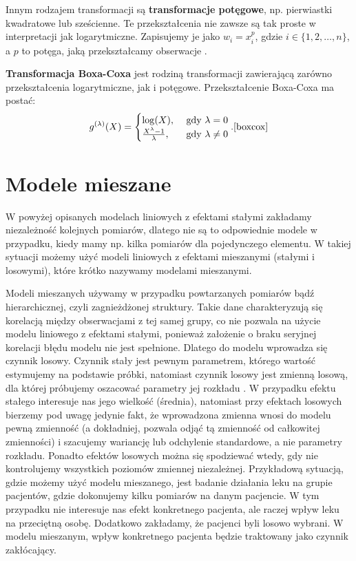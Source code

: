 \documentclass[12pt]{mwbk}
\theoremstyle{plain}
\theoremstyle{definition}
\theoremstyle{definition}
\begin{document}
Innym rodzajem transformacji są \textbf{transformacje potęgowe}, np. pierwiastki kwadratowe lub sześcienne. Te przekształcenia nie zawsze są tak proste w interpretacji jak logarytmiczne. Zapisujemy je jako $w_i=x_i^p$, gdzie $i \in \lbrace{1,2,\ldots,n\rbrace}$, a $p$ to potęga, jaką przekształcamy obserwacje \cite{forecasting}.

\textbf{Transformacja Boxa-Coxa} jest rodziną transformacji zawierającą zarówno przekształcenia logarytmiczne, jak i potęgowe. Przekształcenie Boxa-Coxa ma postać:
$$g^{(\lambda)}(X)=\begin{cases}
\log(X), & \text{ gdy } \lambda=0 \\
\frac{X^{\lambda}-1}{\lambda},&\text{ gdy } \lambda \neq 0
\end{cases}. \cite{boxcox}$$

\section{Modele mieszane} 
W powyżej opisanych modelach liniowych z efektami stałymi zakładamy niezależność kolejnych pomiarów, dlatego nie są to odpowiednie modele w przypadku, kiedy mamy np. kilka pomiarów dla pojedynczego elementu. W takiej sytuacji możemy użyć modeli liniowych z efektami mieszanymi (stałymi i losowymi), które krótko nazywamy modelami mieszanymi.

Modeli mieszanych używamy w przypadku powtarzanych pomiarów bądź hierarchicznej, czyli zagnieżdżonej struktury. Takie dane charakteryzują się korelacją między obserwacjami z tej samej grupy, co nie pozwala na użycie modelu liniowego z efektami stałymi, ponieważ założenie o braku seryjnej korelacji błędu modelu nie jest spełnione. Dlatego do modelu wprowadza się czynnik losowy.  Czynnik stały jest pewnym parametrem, którego wartość estymujemy na podstawie próbki, natomiast czynnik losowy jest zmienną losową, dla której próbujemy oszacować parametry jej rozkładu \cite{faraway}. W przypadku efektu stałego interesuje nas jego wielkość (średnia), natomiast przy efektach losowych bierzemy pod uwagę jedynie fakt, że wprowadzona zmienna wnosi do modelu pewną zmienność (a dokładniej, pozwala odjąć tą zmienność od całkowitej zmienności) i szacujemy wariancję lub odchylenie standardowe, a nie parametry rozkładu. Ponadto efektów losowych można się spodziewać wtedy, gdy nie kontrolujemy wszystkich poziomów zmiennej niezależnej. Przykładową sytuacją, gdzie możemy użyć modelu mieszanego, jest badanie działania leku na grupie pacjentów, gdzie dokonujemy kilku pomiarów na danym pacjencie. W tym przypadku nie interesuje nas efekt konkretnego pacjenta, ale raczej wpływ leku na przeciętną osobę. Dodatkowo zakładamy, że pacjenci byli losowo wybrani. W modelu mieszanym, wpływ konkretnego pacjenta będzie traktowany jako czynnik zakłócający.
\end{document}
